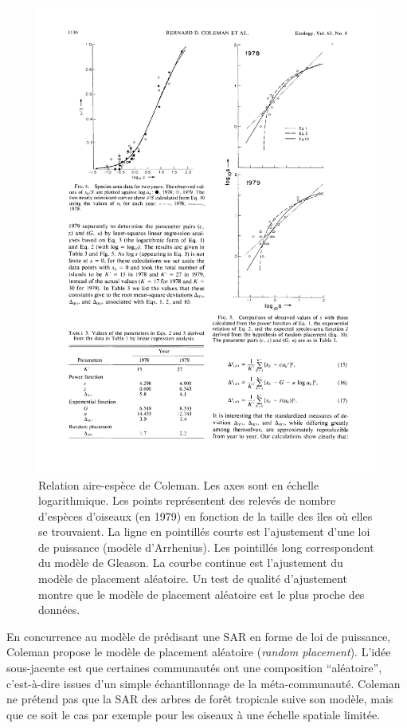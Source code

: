 \documentclass[
  11pt,
  french,
  a4paper,
  extrafontsizes,onecolumn,openright
  ]{memoir}
\begin{document}
\begin{figure}

{\centering \includegraphics[width=0.8\linewidth]{images/Coleman1982} 

}

\caption{Relation aire-espèce de Coleman. Les axes sont en échelle logarithmique. Les points représentent des relevés de nombre d'espèces d'oiseaux (en 1979) en fonction de la taille des îles où elles se trouvaient. La ligne en pointillés courts est l'ajustement d'une loi de puissance (modèle d'Arrhenius). Les pointillés long correspondent du modèle de Gleason. La courbe continue est l'ajustement du modèle de placement aléatoire. Un test de qualité d'ajustement montre que le modèle de placement aléatoire est le plus proche des données.}\label{fig:Coleman1982}
\end{figure}

\normalsize

En concurrence au modèle de \textcite{Preston1962} prédisant une SAR en forme de loi de puissance, Coleman \autocite*{Coleman1981,Coleman1982} propose le modèle de placement aléatoire (\emph{random placement}).
L'idée sous-jacente est que certaines communautés ont une composition \enquote{aléatoire}, c'est-à-dire issues d'un simple échantillonnage de la méta-communauté.
Coleman ne prétend pas que la SAR des arbres de forêt tropicale suive son modèle, mais que ce soit le cas par exemple pour les oiseaux à une échelle spatiale limitée.
\end{document}
